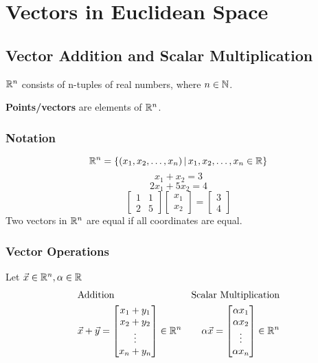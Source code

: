 \documentclass[english, 12pt]{article}
\begin{document}
\notesheader

\section{Vectors in Euclidean Space}

\subsection{Vector Addition and Scalar Multiplication}

\begin{defn}
${\mathbb{R}}^n$ consists of n-tuples of real numbers, where $n \in {\mathbb{N}}$.
\end{defn}

\begin{defn}
\textbf{Points/vectors} are elements of ${\mathbb{R}}^n$.
\end{defn}
\subsubsection*{Notation}
\[{\mathbb{R}}^n = \{(x_{1},x_{2},\dots,x_{n})\,|\, x_{1},x_{2},\dots,x_{n} \in {\mathbb{R}} \}\]
\[x_{1} + x_{2} = 3\]
\[2 x_{1} + 5 x_{2} = 4\]
\[
\begin{bmatrix} 1 & 1 \\ 2 & 5 \end{bmatrix}
\begin{bmatrix} x_{1} \\ x_{2} \end{bmatrix} =
\begin{bmatrix} 3\\ 4 \end{bmatrix} \]
Two vectors in ${\mathbb{R}}^n$ are equal if all coordinates are equal.
\subsubsection*{Vector Operations}
Let $\vec{x} \in {\mathbb{R}}^n, \alpha \in {\mathbb{R}}$
\begin{align*}
& \text{Addition} & \text{Scalar Multiplication} \\
& \vec{x} + \vec{y} =
\begin{bmatrix}
x_{1} + y_{1} \\
x_{2} + y_{2} \\
\vdots \\
x_{n} + y_{n}
\end{bmatrix} \in {\mathbb{R}}^n &
\alpha \vec{x} =
\begin{bmatrix}
\alpha x_{1} \\
\alpha x_{2} \\
\vdots \\
\alpha x_{n}
\end{bmatrix} \in {\mathbb{R}}^n
\end{align*}
\end{document}
